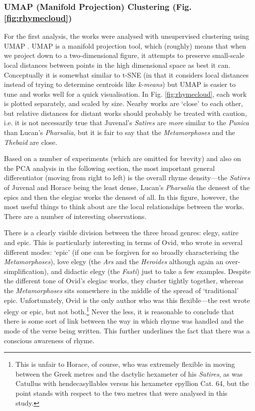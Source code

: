 \documentclass[twocolumn, switch, a4paper]{article} %
\begin{document}
\subsubsection{UMAP (Manifold Projection) Clustering (Fig. \ref{fig:rhymecloud})} 

For the first analysis, the works were analysed with unsupervised clustering
using UMAP \cite{mcinnes_umap_2018}. UMAP is a manifold projection tool, which
(roughly) means that when we project down to a two-dimensional figure, it
attempts to preserve small-scale local distances between points in the high
dimensional space as best it can. Conceptually it is somewhat similar to t-SNE
(in that it considers local distances instead of trying to determine centroids
like \emph{k-means}) but UMAP is easier to tune and works well for a quick
visualisation. In Fig. \ref{fig:rhymecloud}, each work is plotted separately,
and scaled by size. Nearby works are `close' to each other, but relative
distances for distant works should probably be treated with caution, i.e. it
is not necessarily true that Juvenal's \emph{Satires} are \emph{more} similar
to the \emph{Punica} than Lucan's \emph{Pharsalia}, but it is fair to say that
the \emph{Metamorphoses} and the \emph{Thebaid} are close.

Based on a number of experiments (which are omitted for brevity) and also on
the PCA analysis in the following section, the most important general
differentiator (moving from right to left) is the overall rhyme density---the
\emph{Satires} of Juvenal and Horace being the least dense, Lucan's
\emph{Pharsalia} the densest of the epics and then the elegiac works the
densest of all. In this figure, however, the most useful things to think about
are the local relationships between the works. There are a number of
interesting observations.

There is a clearly visible division between the three broad genres: elegy,
satire and epic. This is particularly interesting in terms of Ovid, who wrote
in several different modes: `epic' (if one can be forgiven for so broadly
characterising the \emph{Metamorphoses}), love elegy (the \emph{Ars} and the
\emph{Heroides} although again an over-simplification), and didactic
elegy (the \emph{Fasti}) just to take a few examples. Despite the different
tone of Ovid's elegiac works, they cluster tightly together, whereas the
\emph{Metamorphoses} sits somewhere in the middle of the spread of
`traditional' epic. Unfortunately, Ovid is the only author who was this
flexible---the rest wrote elegy or epic, but not both.\footnote{
  This is unfair to Horace, of course, who was extremely flexible in moving
  between the Greek metres and the dactylic hexameter of his \emph{Satires}, as
  was Catullus with hendecasyllables versus his hexameter epyllion Cat. 64, but
  the point stands with respect to the two metres that were analysed in this
  study.
}
Never the less, it is reasonable to conclude that there is some sort of link
between the way in which rhyme was handled and the mode of the verse being
written. This further underlines the fact that there was a conscious awareness
of rhyme.
\end{document}
